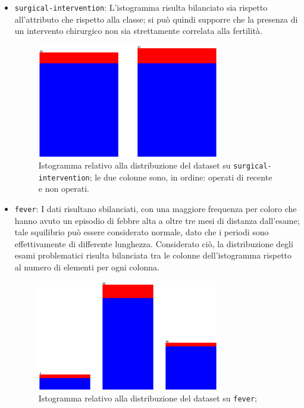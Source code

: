 \begin{itemize}
  \item \texttt{surgical-intervention}:
    L'istogramma risulta bilanciato sia rispetto all'attributo che rispetto alla classe;
    si può quindi supporre che la presenza di un intervento chirurgico non sia strettamente correlata alla fertilità.
    \begin{figure}[H]
      \centering
      \includegraphics[width=0.75\textwidth]{fig/surgical.eps}%
      \caption{%
        Istogramma relativo alla distribuzione del dataset su \texttt{surgical-intervention};
        le due colonne sono, in ordine: operati di recente e non operati.
      }%
      \label{fig:surgical}
    \end{figure}
  \item \texttt{fever}:
    I dati risultano sbilanciati, con una maggiore frequenza per coloro che hanno avuto un episodio di febbre alta a oltre tre mesi di distanza dall'esame;
    tale squilibrio può essere considerato normale, dato che i periodi sono effettivamente di differente lunghezza.
    Considerato ciò, la distribuzione degli esami problematici risulta bilanciata tra le colonne dell'istogramma rispetto al numero di elementi per ogni colonna.
    \begin{figure}[H]
      \centering
      \includegraphics[width=0.75\textwidth]{fig/fever.eps}%
      \caption{%
        Istogramma relativo alla distribuzione del dataset su \texttt{fever};
}
\end{figure}
\end{itemize}
